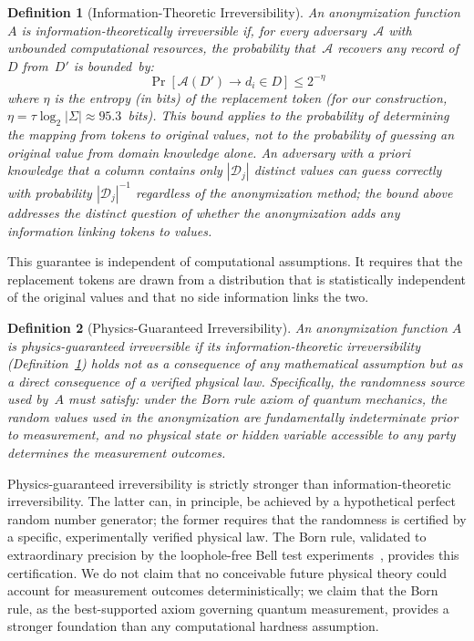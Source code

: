 \documentclass[journal]{IEEEtran}
\newtheorem{definition}{Definition}
\begin{document}
\begin{definition}[Information-Theoretic Irreversibility]
\label{def:it}
An anonymization function~$A$ is \emph{information-theoretically irreversible} if, for every adversary~$\mathcal{A}$ with unbounded computational resources, the probability that~$\mathcal{A}$ recovers any record of~$D$ from~$D'$ is bounded~by:
\begin{equation}
\Pr[\mathcal{A}(D') \to d_i \in D] \leq 2^{-\eta}
\label{eq:it_irrev}
\end{equation}
where $\eta$ is the entropy (in bits) of the replacement token (for our construction, $\eta = \tau \log_2 |\Sigma| \approx 95.3$~bits). This bound applies to the probability of determining the \emph{mapping} from tokens to original values, not to the probability of guessing an original value from domain knowledge alone. An adversary with a priori knowledge that a column contains only $|\mathcal{D}_j|$ distinct values can guess correctly with probability $|\mathcal{D}_j|^{-1}$ regardless of the anonymization method; the bound above addresses the distinct question of whether the anonymization \emph{adds} any information linking tokens to values.
\end{definition}

This guarantee is independent of computational assumptions. It requires that the replacement tokens are drawn from a distribution that is statistically independent of the original values and that no side information links the two.

\begin{definition}[Physics-Guaranteed Irreversibility]
\label{def:phys}
An anonymization function $A$ is \emph{physics-guaranteed irreversible} if its information-theoretic irreversibility (Definition~\ref{def:it}) holds not as a consequence of any mathematical assumption but as a direct consequence of a verified physical law. Specifically, the randomness source used by~$A$ must satisfy: under the Born rule axiom of quantum mechanics, the random values used in the anonymization are fundamentally indeterminate prior to measurement, and no physical state or hidden variable accessible to any party determines the measurement outcomes.
\end{definition}

Physics-guaranteed irreversibility is strictly stronger than information-theoretic irreversibility. The latter can, in principle, be achieved by a hypothetical perfect random number generator; the former requires that the randomness is certified by a specific, experimentally verified physical law. The Born rule, validated to extraordinary precision by the loophole-free Bell test experiments~\cite{hensen2015loophole}, provides this certification. We do not claim that no conceivable future physical theory could account for measurement outcomes deterministically; we claim that the Born rule, as the best-supported axiom governing quantum measurement, provides a stronger foundation than any computational hardness assumption.
\end{document}
